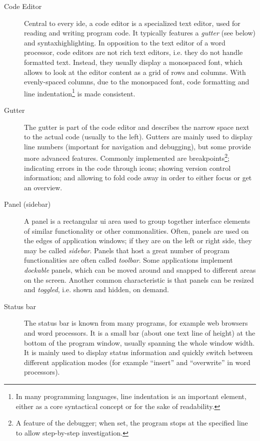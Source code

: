 \begin{description}
\item[Code Editor]
Central to every \gls{ide}, a code editor is a specialized text editor,
used for reading and writing program code. It typically features a
\emph{gutter} (see below) and \gls{syntaxhighlighting}. In opposition to
the text editor of a word processor, code editors are not rich text
editors, i.e. they do not handle formatted text. Instead, they usually
display a monospaced font, which allows to look at the editor content as
a grid of rows and columns. With evenly-spaced columns, due to the
monospaced font, code formatting and line
indentation\footnote{In many programming languages, line indentation is an important element, either as a core syntactical concept or for the sake of readability.}
is made consistent.
\item[Gutter]
The gutter is part of the code editor and describes the narrow space
next to the actual code (usually to the left). Gutters are mainly used
to display line numbers (important for navigation and debugging), but
some provide more advanced features. Commonly implemented are
breakpoints\footnote{A feature of the debugger; when set, the program stops at the specified line to allow step-by-step investigation.};
indicating errors in the code through icons; showing version control
information; and allowing to fold code away in order to either focus or
get an overview.
\item[Panel (sidebar)]
A panel is a rectangular \ac{ui} area used to group together interface
elements of similar functionality or other commonalities. Often, panels
are used on the edges of application windows; if they are on the left or
right side, they may be called \emph{sidebar}. Panels that host a great
number of program functionalities are often called \emph{toolbar}. Some
applications implement \emph{dockable} panels, which can be moved around
and snapped to different areas on the screen. Another common
characteristic is that panels can be resized and \emph{toggled}, i.e.
shown and hidden, on demand.
\item[Status bar]
The status bar is known from many programs, for example web browsers and
word processors. It is a small bar (about one text line of height) at
the bottom of the program window, usually spanning the whole window
width. It is mainly used to display status information and quickly
switch between different application modes (for example “insert” and
“overwrite” in word processors).
\end{description}

